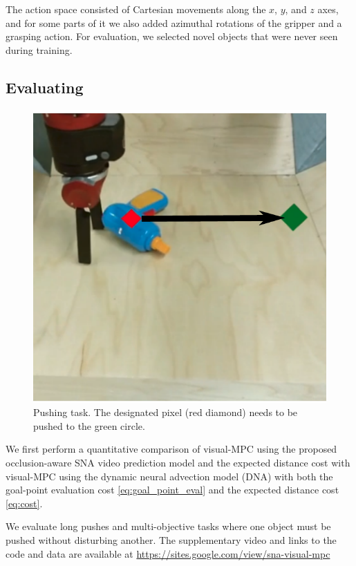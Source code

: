 The action space consisted of Cartesian movements along the $x$, $y$, and $z$ axes, and for some parts of it we also added azimuthal rotations of the gripper and a grasping action. For evaluation, we selected novel objects that were never seen during training. 


\subsection{Evaluating }
\label{subsec:sna_experiments}
\begin{figure}
	\centering
	\includegraphics[width=0.30\columnwidth]{images_sna/longdistance_pushing/pushing.pdf}
	\caption{
		Pushing task. The designated pixel (red diamond) needs to be pushed to the green circle.
		\label{fig:long_distance_task}
	}
\end{figure}

We first perform a quantitative comparison of visual-MPC using the proposed
occlusion-aware SNA video prediction model and the expected distance cost with visual-MPC using the dynamic neural advection model (DNA)\cite{foresight} with both the goal-point evaluation cost \ref{eq:goal_point_eval} and the expected distance cost \ref{eq:cost}.

We evaluate long pushes and multi-objective tasks where one object must be pushed without disturbing another.
The supplementary video and links to the code and data are available at \url{https://sites.google.com/view/sna-visual-mpc}

